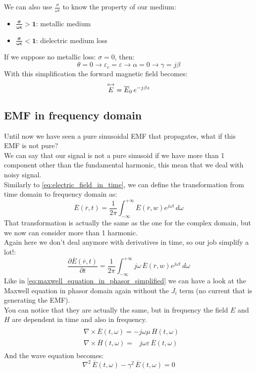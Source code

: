 We can also use $\frac{\sigma}{\omega \epsilon}$ to know the property of our medium:
\begin{itemize}
    \item $\bm{\frac{\sigma}{\omega \epsilon}> 1}$: metallic medium
    \item $\bm{\frac{\sigma}{\omega \epsilon}< 1}$: dielectric medium loss
\end{itemize}
If we suppose no metallic loss: $\sigma = 0$, then:
\begin{equation*}
    \theta=0\rightarrow\varepsilon_c=\varepsilon\rightarrow\alpha=0\rightarrow\gamma =j\beta
\end{equation*}
With this simplification the forward magnetic field becomes:
\begin{equation}
    \overset{\mathbin {{\circ \mkern-2.5mu\rightarrow}}}{E}=\overline{E}_{0}\, e^{-j\beta z}
\end{equation}
\subsection*{EMF in frequency domain}
Until now we have seen a pure sinusoidal EMF that propagates, what if this EMF is not pure?\\
We can say that our signal is not a pure sinusoid if we have more than 1 component other than the fundamental harmonic, this mean that we deal with noisy signal.\\
Similarly to \cref{eq:electric_field_in_time}, we can define the transformation from time domain to frequency domain as:
\begin{equation}
    \overline{E}(\overline{r},t)=\frac{1}{2\pi}\int_{-\infty}^{+\infty}\overline{E}(\overline{r},w)e^{j\omega t}\,d\omega
\end{equation}
That transformation is actually the same as the one for the complex domain, but we now can consider more than 1 harmonic.\\
Again here we don't deal anymore with derivatives in time, so our job simplify a lot!:
\begin{equation}
    \frac{\partial\overline{E}(\overline{r},t)}{\partial t}=\frac{1}{2\pi}\int_{-\infty}^{+\infty}j\omega\,\overline{E}(\overline{r},w)e^{j\omega t}\,d\omega
\end{equation}
Like in \cref{eq:maxwell_equation_in_phasor_simplified} we can have a look at the Maxwell equation in phasor domain again without the $\overline{J}_i$ term (no current that is generating the EMF).\\
You can notice that they are actually the same, but in frequency the field $E$ and $H$ are dependent in time and also in frequency.
\begin{align}
    \begin{split}
        &\nabla\times\overline{E}(t,\omega)=-j\omega\mu\,\overline{H}(t,\omega)\\[5pt]
        &\nabla\times\overline{H}(t,\omega)=\;\;\,j\omega \varepsilon\,\overline{E}(t,\omega)
    \end{split}
\end{align}
And the wave equation becomes:
\begin{equation}
    \nabla^2\,\overline{E}(t,\omega)-\gamma^2\,\overline{E}(t,\omega)=0
\end{equation}
